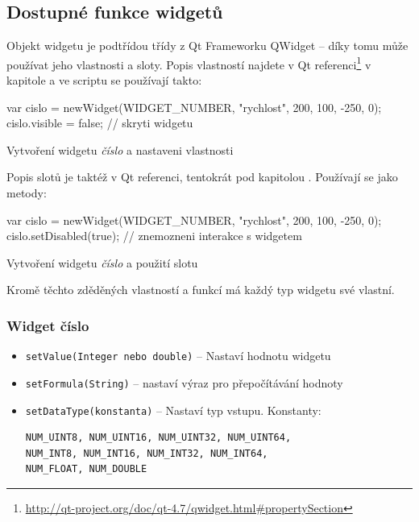 \documentclass[12pt, a4paper, oneside]{article}
\newcommand{\It}{\textit}  %
\begin{document}
\subsection*{Dostupné funkce widgetů}
Objekt widgetu je podtřídou třídy z Qt Frameworku QWidget -- díky tomu může používat jeho vlastnosti a sloty. Popis vlastností najdete v Qt referenci\footnote{\url{http://qt-project.org/doc/qt-4.7/qwidget.html\#propertySection}} v kapitole  a ve scriptu se používají takto:

\begin{listing}[H]
\begin{jscode}
var cislo = newWidget(WIDGET_NUMBER,
                "rychlost", 200, 100, -250, 0);
cislo.visible = false; // skryti widgetu
\end{jscode}
\caption{Vytvoření widgetu \It{číslo} a nastaveni vlastnosti }
\end{listing}
Popis slotů je taktéž v Qt referenci, tentokrát pod kapitolou . Používají se jako metody:

\begin{listing}[H]
\begin{jscode}
var cislo = newWidget(WIDGET_NUMBER,
                "rychlost", 200, 100, -250, 0);
cislo.setDisabled(true); // znemozneni interakce s widgetem
\end{jscode}
\caption{Vytvoření widgetu \It{číslo} a použití slotu}
\end{listing}

Kromě těchto zděděných vlastností a funkcí má každý typ widgetu své vlastní.

\subsubsection*{Widget číslo}
\begin{itemize}
    \item {\color{blue}\verb/setValue(Integer nebo double)/} -- Nastaví hodnotu widgetu
    \item {\color{blue}\verb/setFormula(String)/} -- nastaví výraz pro přepočítávání hodnoty
    \item {\color{blue}\verb/setDataType(konstanta)/} -- Nastaví typ vstupu. Konstanty:
        \begin{verbatim}
NUM_UINT8, NUM_UINT16, NUM_UINT32, NUM_UINT64, 
NUM_INT8, NUM_INT16, NUM_INT32, NUM_INT64, 
NUM_FLOAT, NUM_DOUBLE
        \end{verbatim}
\end{itemize}
\end{document}
